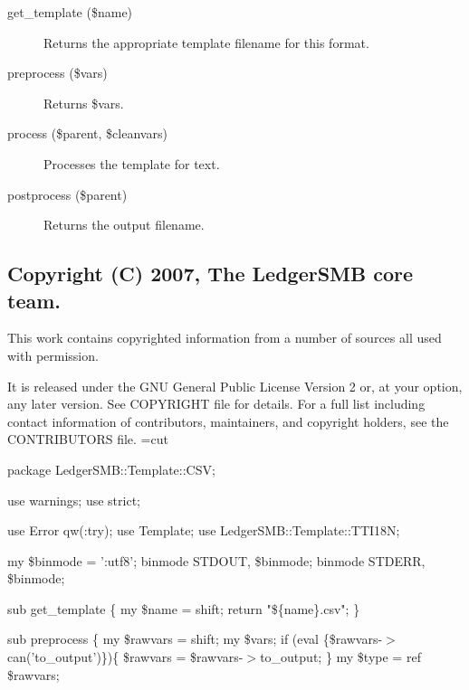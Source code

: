 \begin{description}
\begin{description}
\begin{description}
\begin{description}
\begin{description}
\begin{description}
\begin{description}
\begin{description}
\begin{description}
\begin{description}
\begin{description}
\item[{get\_template (\$name)}] \mbox{}

Returns the appropriate template filename for this format.


\item[{preprocess (\$vars)}] \mbox{}

Returns \$vars.


\item[{process (\$parent, \$cleanvars)}] \mbox{}

Processes the template for text.


\item[{postprocess (\$parent)}] \mbox{}

Returns the output filename.

\end{description}
\subsection*{Copyright (C) 2007, The LedgerSMB core team.\label{LedgerSMB::Template::CSV_Copyright_C_2007_The_LedgerSMB_core_team_}}


This work contains copyrighted information from a number of sources all used
with permission.



It is released under the GNU General Public License Version 2 or, at your 
option, any later version.  See COPYRIGHT file for details.  For a full list 
including contact information of contributors, maintainers, and copyright 
holders, see the CONTRIBUTORS file.
=cut



package LedgerSMB::Template::CSV;



use warnings;
use strict;



use Error qw(:try);
use Template;
use LedgerSMB::Template::TTI18N;



my \$binmode = ':utf8';
binmode STDOUT, \$binmode;
binmode STDERR, \$binmode;



sub get\_template \{
	my \$name = shift;
	return "\$\{name\}.csv";
\}



sub preprocess \{
	my \$rawvars = shift;
	my \$vars;
        if (eval \{\$rawvars-$>$can('to\_output')\})\{
           \$rawvars = \$rawvars-$>$to\_output;
        \}
	my \$type = ref \$rawvars;


\end{description}
\end{description}
\end{description}
\end{description}
\end{description}
\end{description}
\end{description}
\end{description}
\end{description}
\end{description}

